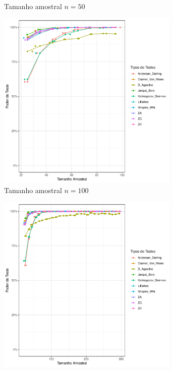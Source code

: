 \documentclass[a4paper,11pt]{article} %
\begin{document}
\begin{figure}[H]
\begin{subfigure}[b]{0.45\textwidth}
        \caption{Tamanho amostral \(n = 50\)}
        \label{fig:cauchy_poder_50}
    \end{subfigure}
    
    \vspace{0.5cm} %
    \begin{subfigure}[b]{0.45\textwidth}
        \centering
        \includegraphics[width=0.95\textwidth]{Distribuição Cauchy/Poder do Teste/poder_teste_cauchy_100.pdf}
        \caption{Tamanho amostral \(n = 100\)}
        \label{fig:cauchy_poder_100}
    \end{subfigure}
    \hfill
    \begin{subfigure}[b]{0.45\textwidth}
        \centering
        \includegraphics[width=0.95\textwidth]{Distribuição Cauchy/Poder do Teste/poder_teste_cauchy_300.pdf}

\end{subfigure}
\end{figure}
\end{document}
